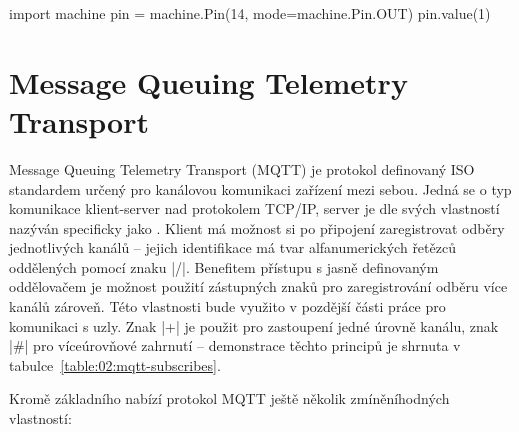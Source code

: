 \begin{code}
    import machine
    pin = machine.Pin(14, mode=machine.Pin.OUT)
    pin.value(1)
\end{code}


\section{Message Queuing Telemetry Transport}\label{sec:message-queuing-telemetry-transport}
Message Queuing Telemetry Transport (MQTT) je protokol definovaný ISO standardem určený pro kanálovou komunikaci zařízení
mezi sebou.
Jedná se o typ komunikace klient-server nad protokolem TCP/IP, server je dle svých vlastností nazýván specificky jako .
Klient má možnost si po připojení zaregistrovat odběry jednotlivých kanálů -- jejich identifikace má tvar
alfanumerických řetězců oddělených pomocí znaku \ic|/|.
Benefitem přístupu s jasně definovaným oddělovačem je možnost použití zástupných znaků pro
zaregistrování odběru více kanálů zároveň.
Této vlastnosti bude využito v pozdější části práce pro komunikaci s uzly.
Znak \ic|+| je použit pro zastoupení jedné úrovně kanálu, znak \ic|#| pro víceúrovňové zahrnutí -- demonstrace těchto
principů je shrnuta v tabulce~\ref{table:02:mqtt-subscribes}.

Kromě základního nabízí protokol MQTT ještě několik zmíněníhodných vlastností:

